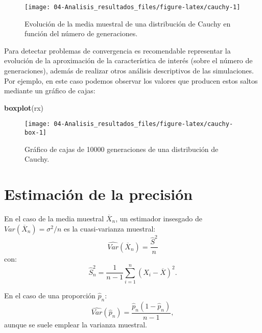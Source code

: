 \documentclass[
]{book}
\newenvironment{Shaded}{\begin{snugshade}}{\end{snugshade}}
\newcommand{\KeywordTok}[1]{\textcolor[rgb]{0.13,0.29,0.53}{\textbf{#1}}}
\newcommand{\NormalTok}[1]{#1}
\theoremstyle{break}
\theoremstyle{definition}
\theoremstyle{definition}
\theoremstyle{definition}
\theoremstyle{remark}
\begin{document}
\begin{figure}[!htb]

{\centering \texttt{[image: 04-Analisis\_resultados\_files/figure-latex/cauchy-1]} 

}

\caption{Evolución de la media muestral de una distribución de Cauchy en función del número de generaciones.}\label{fig:cauchy}
\end{figure}

Para detectar problemas de convergencia es recomendable representar la evolución de la aproximación de la característica de interés (sobre el número de generaciones),
además de realizar otros análisis descriptivos de las simulaciones.
Por ejemplo, en este caso podemos observar los valores que producen estos saltos mediante un gráfico de cajas:

\begin{Shaded}
\begin{Highlighting}[]
\KeywordTok{boxplot}\NormalTok{(rx)}
\end{Highlighting}
\end{Shaded}

\begin{figure}[!htb]

{\centering \texttt{[image: 04-Analisis\_resultados\_files/figure-latex/cauchy-box-1]} 

}

\caption{Gráfico de cajas de 10000 generaciones de una distribución de Cauchy.}\label{fig:cauchy-box}
\end{figure}

\hypertarget{estimaciuxf3n-de-la-precisiuxf3n}{%
\section{Estimación de la precisión}\label{estimaciuxf3n-de-la-precisiuxf3n}}

En el caso de la media muestral \(\overline{X}_{n}\), un estimador
insesgado de \(Var\left( \overline{X}_{n}\right) =\sigma ^{2}/n\) es la cuasi-varianza muestral:
\[\widehat{Var}\left( \overline{X}_{n}\right) =\frac{\widehat{S}^{2}}{n}\]
con:
\[\widehat{S}_{n}^{2}=\dfrac{1}{n-1}\sum\limits_{i=1}^{n}\left( X_{i}-
\overline{X}\right) ^{2}.\]

En el caso de una proporción \(\hat{p}_{n}\):
\[\widehat{Var}\left( \hat{p}_{n}\right) 
=\frac{\hat{p}_{n}(1-\hat{p}_{n})}{n-1},\]
aunque se suele emplear la varianza muestral.
\end{document}
